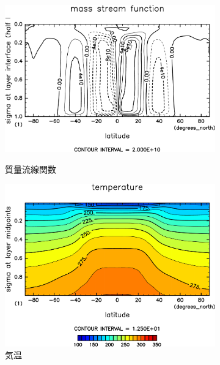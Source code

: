 \documentclass[body]{subfiles}
\begin{document}
\begin{figure}[t]
\begin{subfigure}{.4\textwidth}
		\includegraphics[width=\textwidth]{S1500/MSF,time=3650:4015-crop-rotate.pdf}
		\\\vspace{13pt}
		\caption{質量流線関数\hmu*{[kg/s]}}\label{S1500質量流線関数}
	\end{subfigure}
	\begin{subfigure}{.4\textwidth}
		\centering
		\includegraphics[width=\textwidth]{S1500/Temp,time=3650:4015-crop-rotate.pdf}
		\caption{気温\hmu*{[K]}}\label{S1500気温分布}
	\end{subfigure}
	\begin{subfigure}{.4\textwidth}
		\centering

\end{subfigure}
\end{figure}
\end{document}
